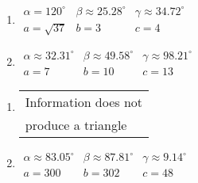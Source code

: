 \begin{multicols}{2} 

\begin{enumerate}

\setcounter{enumi}{\value{HW}}

\item $\begin{array}{lll}
\alpha = 120^{\circ} & \beta \approx 25.28^{\circ} & \gamma \approx 34.72^{\circ} \\
a = \sqrt{37} & b = 3 & c = 4 \end{array}$

\item $\begin{array}{lll}
\alpha \approx 32.31^{\circ} & \beta \approx 49.58^{\circ} & \gamma \approx 98.21^{\circ} \\
a = 7 & b = 10 & c = 13 \end{array}$

\setcounter{HW}{\value{enumi}}

\end{enumerate}

\end{multicols}

\begin{multicols}{2} 

\begin{enumerate}

\setcounter{enumi}{\value{HW}}

\item \begin{tabular}{l}
Information does not \\
produce a triangle \end{tabular}

\item $\begin{array}{lll}
\alpha \approx 83.05^{\circ} & \beta \approx 87.81^{\circ} & \gamma \approx 9.14^{\circ} \\
a = 300 & b = 302 & c = 48 \end{array}$

\setcounter{HW}{\value{enumi}}

\end{enumerate}

\end{multicols}

